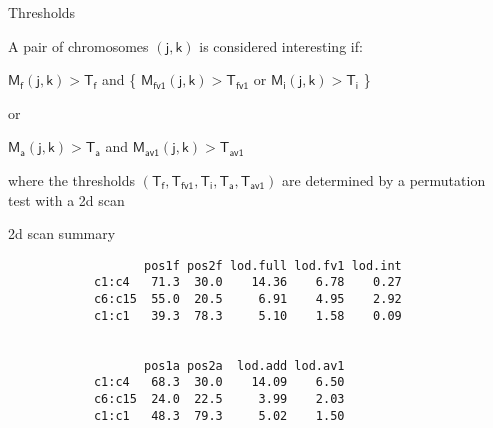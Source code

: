 \documentclass[aspectratio=169,12pt,t]{beamer}
\newcommand{\M}{\text{M}}
\begin{document}
\begin{frame}{Thresholds}


\hfill \begin{minipage}[t]{9.5in}
A pair of chromosomes {\lolit $\mathsf{(j,k)}$} is considered interesting if:

\bigskip

{\lolit
\centerline{$ \mathsf{\M_f(j,k)} > \mathsf{ T_f }$ \hspace{5mm} {\hilit and }
\hspace{5mm}
{\hilit \{} $ \mathsf{\M_{fv1}(j,k)} > \mathsf{ T_{fv1} }$
{\hilit or }
$ \mathsf{\M_i(j,k)} > \mathsf{ T_i }$  {\hilit \}}}

\bigskip

\centerline{\hilit or }

\bigskip

\centerline{$ \mathsf{\M_a(j,k)} > \mathsf{ T_a }$ \hspace{5mm} {\hilit and }
\hspace{5mm}
$ \mathsf{\M_{av1}(j,k)} > \mathsf{ T_{av1} }$ }
}


\bigskip

where the thresholds {\lolit $\mathsf{(T_f, T_{fv1}, T_i, T_a,
    T_{av1})}$} are determined by a permutation test with a 2d scan

\end{minipage} \hspace{0.5in}


\end{frame}








\begin{frame}[fragile]{2d scan summary}



\begin{verbatim}
                   pos1f pos2f lod.full lod.fv1 lod.int
            c1:c4   71.3  30.0    14.36    6.78    0.27
            c6:c15  55.0  20.5     6.91    4.95    2.92
            c1:c1   39.3  78.3     5.10    1.58    0.09


                   pos1a pos2a  lod.add lod.av1
            c1:c4   68.3  30.0    14.09    6.50
            c6:c15  24.0  22.5     3.99    2.03
            c1:c1   48.3  79.3     5.02    1.50
\end{verbatim}



\end{frame}
\end{document}
